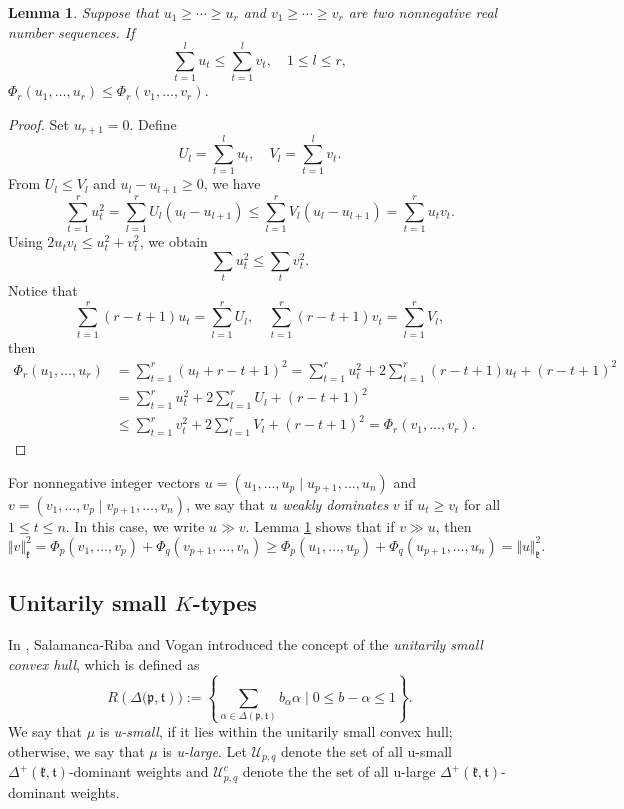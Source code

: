 \documentclass[11pt]{amsart}
\theoremstyle{plain}
\newtheorem{lemma}[thm]{Lemma}
\theoremstyle{definition}
\newcommand{\frk}{\mathfrak{k}}
\newcommand{\frp}{\mathfrak{p}}
\newcommand{\frt}{\mathfrak{t}}
\begin{document}
 \begin{lemma}\label{lem-Phi}
 	Suppose that $u_1\ge\cdots\ge u_r$ and $v_1\ge\cdots\ge v_r$ are two nonnegative real number sequences. If
 	\[\sum_{t=1}^l u_t\le \sum_{t=1}^lv_t,\quad 1\le l\le r,\]
 	$\Phi_r(u_1,\dots,u_r)\le\Phi_r(v_1,\dots,v_r)$.
 \end{lemma}
 \begin{proof}
 	Set $u_{r+1}=0$. Define
 	\[U_l=\sum_{t=1}^l u_t,\quad V_l=\sum_{t=1}^l v_t.\]
 	From $U_l\le V_l$ and $u_l-u_{l+1}\ge 0$, we have
 	\[\sum_{t=1}^ru_t^2=\sum_{l=1}^rU_l(u_l-u_{l+1})\le\sum_{l=1}^rV_l(u_l-u_{l+1})=\sum_{t=1}^ru_tv_t.\]
 	Using $2u_tv_t\le u_t^2+v_t^2$, we obtain
 	\[\sum_tu_t^2\le \sum_{t} v_t^2.\]
 	Notice that
 	\[\sum_{t=1}^r(r-t+1)u_t=\sum_{l=1}^rU_l,\quad \sum_{t=1}^r(r-t+1)v_t=\sum_{l=1}^rV_l,\]
 	then
 	\begin{align*}
 	\Phi_r(u_1,\dots,u_r)&=\sum_{t=1}^r(u_{t}+r-t+1)^2=\sum_{t=1}^ru_t^2+2\sum_{t=1}^r(r-t+1)u_t+(r-t+1)^2\\
 	&=\sum_{t=1}^ru_t^2+2\sum_{l=1}^rU_l+(r-t+1)^2\\
 	&\le \sum_{t=1}^rv_t^2+2\sum_{l=1}^rV_l+(r-t+1)^2=\Phi_r(v_1,\dots,v_r).
 \end{align*}
 \end{proof}
  For nonnegative integer vectors $u=(u_1,\dots,u_p\mid u_{p+1},\dots,u_n)$ and $v=(v_1,\dots,v_p\mid v_{p+1},\dots,v_n)$, we say that $u$  \emph{weakly dominates} $v$ if $u_t\ge v_t$ for all $1\le t\le n$. In this case, we write $u\gg v$. Lemma \ref{lem-Phi} shows that if $v\gg u$, then
  \begin{equation}\label{weakly-dominate}
  \Vert v\Vert_\frk^2=\Phi_p(v_1,\dots,v_p)+\Phi_q(v_{p+1},\dots,v_n)\ge \Phi_p(u_1,\dots,u_p)+\Phi_q(u_{p+1},\dots,u_n)=\Vert u\Vert_\frk^2.
  \end{equation}



\subsection{Unitarily small $K$-types}In \cite{SV}, Salamanca-Riba and Vogan introduced the concept of the \emph{unitarily small convex hull}, which is defined as
\[R(\Delta\big(\frp,\frt)\big):=\left\{\sum_{\alpha\in\Delta(\frp,\frt)}b_\alpha\alpha\mid 0\le b-\alpha\le 1\right\}.\]
 We say that $\mu$ is \emph{u-small}, if it lies within the unitarily small convex hull; otherwise, we say that $\mu$ is \emph{u-large}. Let $\mathcal{U}_{p,q}$ denote the set of all u-small $\Delta^+(\frk,\frt)$-dominant weights and $\mathcal{U}_{p,q}^c$ denote the the set of all u-large $\Delta^+(\frk,\frt)$-dominant weights.
\end{document}
